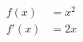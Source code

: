 \documentclass{article}
\begin{document}
\begin{align}
f(x) &= x^2\\
f'(x) &= 2x\\
\end{align}
\end{document}
